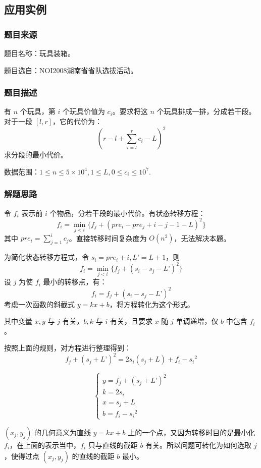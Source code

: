 \subsection{应用实例}

\subsubsection{题目来源}

题目名称：玩具装箱。

题目选自：NOI2008湖南省省队选拔活动。

\subsubsection{题目描述}

有 \(n\) 个玩具，第 \(i\) 个玩具价值为 \(c_i\)。要求将这 \(n\)
个玩具排成一排，分成若干段。对于一段 \([l,r]\)，它的代价为： \[
(r-l+\sum_{i=l}^r c_i-L)^2
\] 求分段的最小代价。

数据范围：\(1\le n\le 5\times 10^4,1\le L,0\le c_i\le 10^7\).

\subsubsection{解题思路}

令 \(f_i\) 表示前 \(i\) 个物品，分若干段的最小代价。有状态转移方程： \[
f_i=\min_{j<i}{\{f_j+(pre_i-pre_j+i-j-1-L)^2\}}
\] 其中 \(pre_i = \sum_{j=1}^i c_j\)。直接转移时间复杂度为
\(O (n^2)\)，无法解决本题。

为简化状态转移方程式，令 \(s_i=pre_i+i,L’=L+1\)，则 \[
f_i=\min_{j<i}\{f_j+(s_i-s_j-L’)^2\}
\] 设 \(j\) 为使 \(f_i\) 最小的转移点，有： \[
f_i=f_j+(s_i-s_j-L’)^2
\] 考虑一次函数的斜截式 \(y=kx+b\)，将方程转化为这个形式。

其中变量 \(x, y\) 与 \(j\) 有关，\(b, k\) 与 \(i\) 有关，且要求 \(x\) 随
\(j\) 单调递增，仅 \(b\) 中包含 \(f_i\)。

按照上面的规则，对方程进行整理得到： \[
f_j+(s_j+L’)^2=2s_i(s_j+L)+f_i-{s_i}^2
\]

\[
\left\{
\begin{array}{lr}
y = f_j+(s_j+L’)^2\\
k = 2s_i\\
x = s_j+L\\
b = f_i-{s_i}^2
\end{array}
\right.
\]

\((x_j, y_j)\) 的几何意义为直线 \(y=kx+b\)
上的一个点，又因为转移时目的是最小化 \(f_i\)，在上面的表示当中，\(f_i\)
只与直线的截距 \(b\) 有关。所以问题可转化为如何选取 \(j\) ，使得过点
\((x_j, y_j)\) 的直线的截距 \(b\) 最小。

